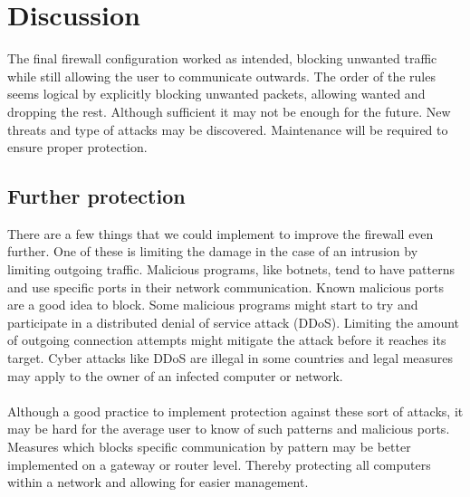 \section{Discussion} 
\label{sec:discussion}

The final firewall configuration worked as intended, blocking unwanted traffic while still allowing the user to communicate outwards. The order of the rules seems logical by explicitly blocking unwanted packets, allowing wanted and dropping the rest. Although sufficient it may not be enough for the future. New threats and type of attacks may be discovered. Maintenance will be required to ensure proper protection.


\subsection{Further protection}
There are a few things that we could implement to improve the firewall even further. One of these is limiting the damage in the case of an intrusion by limiting outgoing traffic. Malicious programs, like botnets, tend to have patterns and use specific ports in their network communication. Known malicious ports are a good idea to block. Some malicious programs might start to try and participate in a distributed denial of service attack (DDoS). Limiting the amount of outgoing connection attempts might mitigate the attack before it reaches its target. Cyber attacks like DDoS are illegal in some countries and legal measures may apply to the owner of an infected computer or network.\\
\\
Although a good practice to implement protection against these sort of attacks, it may be hard for the average user to know of such patterns and malicious ports. Measures which blocks specific communication by pattern may be better implemented on a gateway or router level. Thereby protecting all computers within a network and allowing for easier management.

